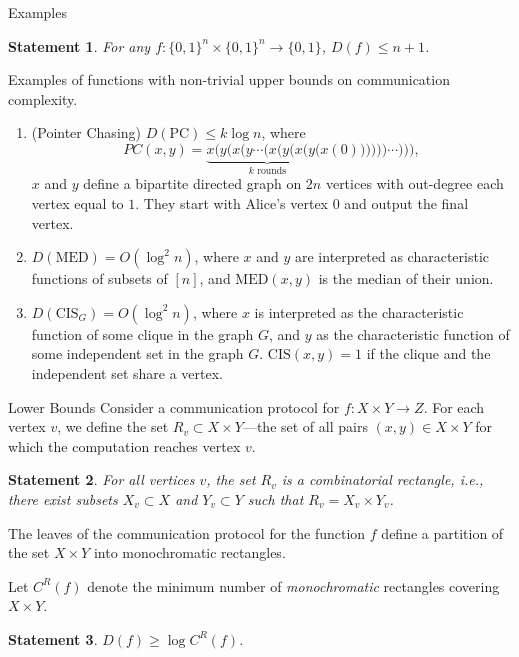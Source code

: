 \documentclass[aspectratio=169]{beamer}
\newcommand{\pitem}{\pause\item}
\newtheorem{statement}{Statement}
\newcommand{\bits}{\{0,1\}}
\begin{document}
\begin{frame}{Examples}
    \begin{statement}
        For any $f: \{0,1\}^n \times\{0,1\}^n \to \bits$, $D(f) \le n + 1$.
    \end{statement}

    \pause
    Examples of functions with non-trivial upper bounds on communication complexity.
    \begin{enumerate}
        \item (Pointer Chasing) $D(\mathrm{PC}) \le k \log n$,
        where \[PC(x,y) = \underbrace{x(y(x(y\dotsb(x(y(x(y(x}_{\text{$k$ rounds}}(0))))))\dotsb))),\]
        $x$ and $y$ define a bipartite directed graph on $2n$ vertices with out-degree each vertex equal to $1$.
        They start with Alice's vertex $0$ and output the final vertex.


        \pitem $D(\mathrm{MED}) = O(\log^2 n)$, where $x$ and $y$ are interpreted as characteristic functions of subsets of $[n]$, and $\mathrm{MED}(x,y)$ is the median of their union.

        \pitem $D(\mathrm{CIS}_G) = O(\log^2 n)$, where $x$ is interpreted as the characteristic function of some clique in the graph $G$, and $y$ as the characteristic function of some independent set in the graph $G$. $\mathrm{CIS}(x,y) = 1$ if the clique and the independent set share a vertex.
    \end{enumerate}

\end{frame}

\begin{frame}{Lower Bounds}
    Consider a communication protocol for $f: X \times Y \to Z$. For each vertex $v$, we define the set $R_v \subset X \times Y$—the set of all pairs $(x,y) \in X \times Y$ for which the computation reaches vertex $v$.

    \pause
    \begin{statement}
        For all vertices $v$, the set $R_v$ is a combinatorial rectangle, i.e., there exist subsets $X_v \subset X$ and $Y_v \subset Y$ such that $R_v = X_v \times Y_v$.
    \end{statement}

    \pause
    \begin{corollary}
        The leaves of the communication protocol for the function $f$ define a partition of the set $X \times Y$ into monochromatic rectangles.
    \end{corollary}

    Let $C^R(f)$ denote the minimum number of \emph{monochromatic} rectangles covering $X \times Y$.

    \pause
    \begin{statement}
        $D(f) \ge \log C^R(f)$.
    \end{statement}

\end{frame}
\end{document}
